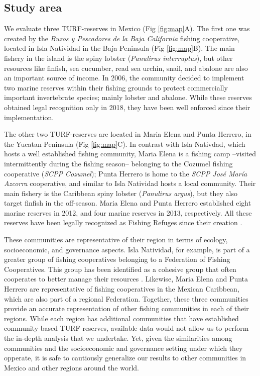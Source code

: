 \documentclass{frontiersSCNS}
\theoremstyle{definition}
\theoremstyle{definition}
\theoremstyle{definition}
\theoremstyle{remark}
\begin{document}
\subsection{Study area}\label{study-area}

We evaluate three TURF-reserves in Mexico (Fig \ref{fig:map}A). The
first one was created by the \emph{Buzos y Pescadores de la Baja
California} fishing cooperative, located in Isla Natividad in the Baja
Peninsula (Fig \ref{fig:map}B). The main fishery in the island is the
spiny lobster (\emph{Panulirus interruptus}), but other resources like
finfish, sea cucumber, read sea urchin, snail, and abalone are also an
important source of income. In 2006, the community decided to implement
two marine reserves within their fishing grounds to protect commercially
important invertebrate species; mainly lobster and abalone. While these
reserves obtained legal recognition only in 2018, they have been well
enforced since their implementation.

The other two TURF-reserves are located in Maria Elena and Punta
Herrero, in the Yucatan Peninsula (Fig \ref{fig:map}C). In contrast with
Isla Nativdad, which hosts a well established fishing community, Maria
Elena is a fishing camp --visited intermittently during the fishing
season-- belonging to the Cozumel fishing cooperative (\emph{SCPP
Cozumel}); Punta Herrero is home to the \emph{SCPP José María Azcorra}
cooperative, and similar to Isla Natividad hosts a local community.
Their main fishery is the Caribbean spiny lobster (\emph{Panulirus
argus}), but they also target finfish in the off-season. Maria Elena and
Punta Herrero established eight marine reserves in 2012, and four marine
reserves in 2013, respectively. All these reserves have been legally
recognized as Fishing Refuges since their creation
\citep{dof_website_2012,dof_website_2013}.

These communities are representative of their region in terms of
ecology, socioeconomic, and governance aspects. Isla Natividad, for
example, is part of a greater group of fishing cooperatives belonging to
a Federation of Fishing Cooperatives. This group has been identified as
a cohesive group that often cooperates to better manage their resources
\citep{mccay_2017-1m,mccay_2014-CN,acevesbueno_2017}. Likewise, Maria
Elena and Punta Herrero are representative of fishing cooperatives in
the Mexican Caribbean, which are also part of a regional Federation.
Together, these three communities provide an accurate representation of
other fishing communities in each of their regions. While each region
has additional communities that have established community-based
TURF-reserves, available data would not allow us to perform the in-depth
analysis that we undertake. Yet, given the similarities among
communities and the socioeconomic and governance setting under which
they opperate, it is safe to cautiously generalize our results to other
communities in Mexico and other regions around the world.
\end{document}
